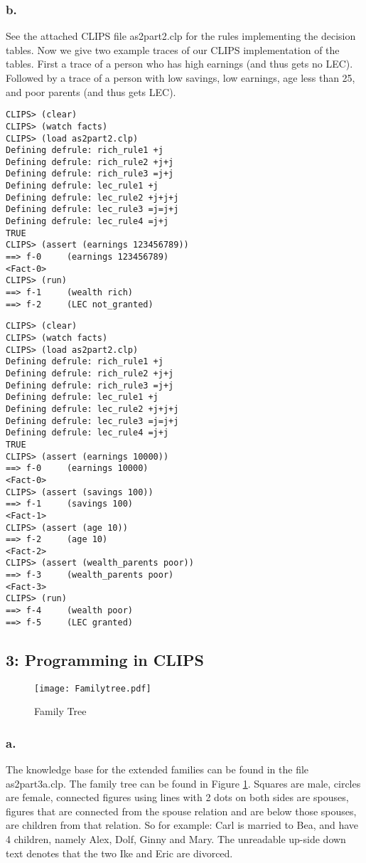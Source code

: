 \documentclass[a4paper]{article}
\begin{document}
\subsubsection*{b.}
See the attached CLIPS file as2part2.clp for the rules implementing the decision tables. Now we give two example traces of our CLIPS implementation of the tables. First a trace of a person who has high earnings (and thus gets no LEC). Followed by  a trace of a person with low savings, low earnings, age less than 25, and poor parents (and thus gets LEC).
\begin{Verbatim}[fontsize=\small]
CLIPS> (clear)
CLIPS> (watch facts)
CLIPS> (load as2part2.clp)
Defining defrule: rich_rule1 +j
Defining defrule: rich_rule2 +j+j
Defining defrule: rich_rule3 =j+j
Defining defrule: lec_rule1 +j
Defining defrule: lec_rule2 +j+j+j
Defining defrule: lec_rule3 =j=j+j
Defining defrule: lec_rule4 =j+j
TRUE
CLIPS> (assert (earnings 123456789))
==> f-0     (earnings 123456789)
<Fact-0>
CLIPS> (run)
==> f-1     (wealth rich)
==> f-2     (LEC not_granted)
\end{Verbatim}
\begin{Verbatim}[fontsize=\small]
CLIPS> (clear)
CLIPS> (watch facts)
CLIPS> (load as2part2.clp)
Defining defrule: rich_rule1 +j
Defining defrule: rich_rule2 +j+j
Defining defrule: rich_rule3 =j+j
Defining defrule: lec_rule1 +j
Defining defrule: lec_rule2 +j+j+j
Defining defrule: lec_rule3 =j=j+j
Defining defrule: lec_rule4 =j+j
TRUE
CLIPS> (assert (earnings 10000))
==> f-0     (earnings 10000)
<Fact-0>
CLIPS> (assert (savings 100))
==> f-1     (savings 100)
<Fact-1>
CLIPS> (assert (age 10))
==> f-2     (age 10)
<Fact-2>
CLIPS> (assert (wealth_parents poor))
==> f-3     (wealth_parents poor)
<Fact-3>
CLIPS> (run)
==> f-4     (wealth poor)
==> f-5     (LEC granted)
\end{Verbatim}

\subsection*{3: Programming in CLIPS}

\begin{figure}[htp]
\centering
\texttt{[image: Familytree.pdf]}\\
\caption{Family Tree}\label{fig:famtree}
\end{figure}

\subsubsection*{a.}
The knowledge base for the extended families can be found in the file as2part3a.clp. The family tree can be found in Figure \ref{fig:famtree}. Squares are male, circles are female, connected figures using lines with 2 dots on both sides are spouses, figures that are connected from the spouse relation and are below those spouses, are children from that relation. So for example: Carl is married to Bea, and have 4 children, namely Alex, Dolf, Ginny and Mary. The unreadable up-side down text denotes that the two Ike and Eric are divorced.
\end{document}
